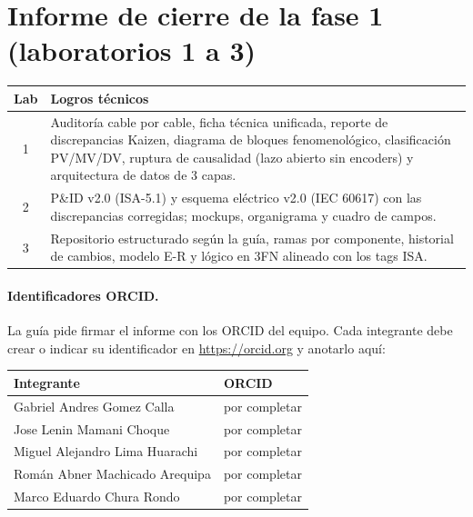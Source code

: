 \documentclass[a4paper,11pt]{article}
\begin{document}
\section{Informe de cierre de la fase 1 (laboratorios 1 a 3)}
\begin{center}\small
\begin{tabularx}{\linewidth}{c >{\raggedright\arraybackslash}X}
\toprule
\textbf{Lab} & \textbf{Logros técnicos}\\
\midrule
1 & Auditoría cable por cable, ficha técnica unificada, reporte de discrepancias Kaizen, diagrama de bloques fenomenológico, clasificación PV/MV/DV, ruptura de causalidad (lazo abierto sin encoders) y arquitectura de datos de 3 capas.\\
2 & P\&ID v2.0 (ISA-5.1) y esquema eléctrico v2.0 (IEC 60617) con las discrepancias corregidas; mockups, organigrama y cuadro de campos.\\
3 & Repositorio estructurado según la guía, ramas por componente, historial de cambios, modelo E-R y lógico en 3FN alineado con los tags ISA.\\
\bottomrule
\end{tabularx}
\end{center}

\paragraph{Identificadores ORCID.} La guía pide firmar el informe con los ORCID del equipo. Cada integrante debe crear o indicar su identificador en \url{https://orcid.org} y anotarlo aquí:
\begin{center}\small
\begin{tabular}{l l}
\toprule
\textbf{Integrante} & \textbf{ORCID}\\
\midrule
Gabriel Andres Gomez Calla & por completar\\
Jose Lenin Mamani Choque & por completar\\
Miguel Alejandro Lima Huarachi & por completar\\
Román Abner Machicado Arequipa & por completar\\
Marco Eduardo Chura Rondo & por completar\\
\bottomrule
\end{tabular}
\end{center}
\end{document}
